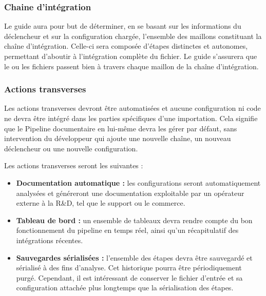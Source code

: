 \subsubsection{Chaine d'intégration}

Le guide aura pour but de déterminer, en se basant sur les informations du déclencheur et sur la configuration chargée, l'ensemble des maillons constituant la chaîne d'intégration. Celle-ci sera composée d'étapes distinctes et autonomes, permettant d'aboutir à l'intégration complète du fichier. Le guide s'assurera que le ou les fichiers passent bien à travers chaque maillon de la chaîne d'intégration.

\subsubsection{Actions transverses}

Les actions transverses devront être automatisées et aucune configuration ni code ne devra être intégré dans les parties spécifiques d'une importation. Cela signifie que le Pipeline documentaire en lui-même devra les gérer par défaut, sans intervention du développeur qui ajoute une nouvelle chaîne, un nouveau déclencheur ou une nouvelle configuration.

Les actions transverses seront les suivantes :

\begin{itemize}
    \item \textbf{Documentation automatique :} les configurations seront automatiquement analysées et généreront une documentation exploitable par un opérateur externe à la R\&D, tel que le support ou le commerce.
    \item \textbf{Tableau de bord :} un ensemble de tableaux devra rendre compte du bon fonctionnement du pipeline en temps réel, ainsi qu'un récapitulatif des intégrations récentes.
    \item \textbf{Sauvegardes sérialisées :} l'ensemble des étapes devra être sauvegardé et sérialisé à des fins d'analyse. Cet historique pourra être périodiquement purgé. Cependant, il est intéressant de conserver le fichier d'entrée et sa configuration attachée plus longtemps que la sérialisation des étapes.
\end{itemize}

